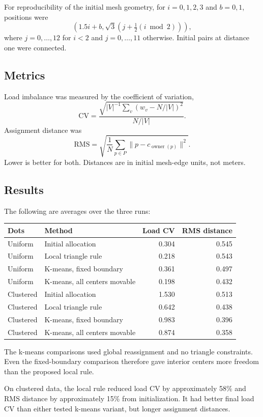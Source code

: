 \documentclass[11pt]{article}
\begin{document}
For reproducibility of the initial mesh geometry, for $i=0,1,2,3$ and $b=0,1$, positions were
\[
\left(1.5i+b,\sqrt{3}\left(j+\tfrac12(i\bmod2)\right)\right),
\]
where $j=0,\ldots,12$ for $i<2$ and $j=0,\ldots,11$ otherwise. Initial pairs at distance one were connected.

\subsection{Metrics}
Load imbalance was measured by the coefficient of variation,
\[
\mathrm{CV}=\frac{\sqrt{|V|^{-1}\sum_v(w_v-N/|V|)^2}}{N/|V|}.
\]
Assignment distance was
\[
\mathrm{RMS}=\sqrt{\frac1N\sum_{p\in P}\|p-c_{\operatorname{owner}(p)}\|^2}.
\]
Lower is better for both. Distances are in initial mesh-edge units, not meters.

\subsection{Results}
The following are averages over the three runs:
\begin{center}
\begin{tabular}{llrr}
\toprule
Dots & Method & Load CV & RMS distance\\
\midrule
Uniform & Initial allocation & 0.304 & 0.545\\
Uniform & Local triangle rule & 0.218 & 0.543\\
Uniform & K-means, fixed boundary & 0.361 & 0.497\\
Uniform & K-means, all centers movable & 0.198 & 0.432\\
\midrule
Clustered & Initial allocation & 1.530 & 0.513\\
Clustered & Local triangle rule & 0.642 & 0.438\\
Clustered & K-means, fixed boundary & 0.983 & 0.396\\
Clustered & K-means, all centers movable & 0.874 & 0.358\\
\bottomrule
\end{tabular}
\end{center}
The k-means comparisons used global reassignment and no triangle constraints. Even the fixed-boundary comparison therefore gave interior centers more freedom than the proposed local rule.

On clustered data, the local rule reduced load CV by approximately 58\% and RMS distance by approximately 15\% from initialization. It had better final load CV than either tested k-means variant, but longer assignment distances.
\end{document}
